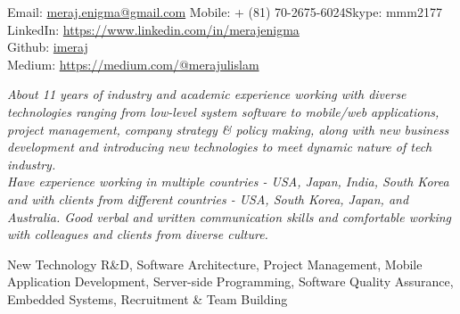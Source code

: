 \documentclass[10pt,a4paper]{article} %
\begin{document}


\noindent Email: \href{mailto:meraj.enigma@gmail.com}{meraj.enigma@gmail.com}\bull
\textsmaller Mobile: {+} (81) 70-2675-6024\bull Skype: mmm2177\\
LinkedIn: \href{https://www.linkedin.com/in/merajenigma}{https://www.linkedin.com/in/merajenigma}\\
Github: \href{https://github.com/imeraj}{imeraj} \\
Medium: \href{https://medium.com/@merajulislam} {https://medium.com/@merajulislam}


\spacedhrule{0.9em}{-0.4em} %



\vspace{-1.3em} %

\begin{multicols}{2}  %
\noindent \textit{About 11 years of industry and academic experience working with diverse technologies ranging from low-level system software to mobile/web applications, project management, company strategy \& policy making, along with new business development and introducing new technologies to meet dynamic nature of tech industry.\\
Have experience working in multiple countries - USA, Japan, India, South Korea and with clients from different countries - USA, South Korea, Japan, and Australia. Good verbal and written communication skills and comfortable working with colleagues and clients from diverse culture.}
\end{multicols}

 New Technology R\&D, Software Architecture, Project Management, Mobile Application Development, Server-side Programming, Software Quality Assurance, Embedded Systems, Recruitment \& Team Building\\
\end{document}
